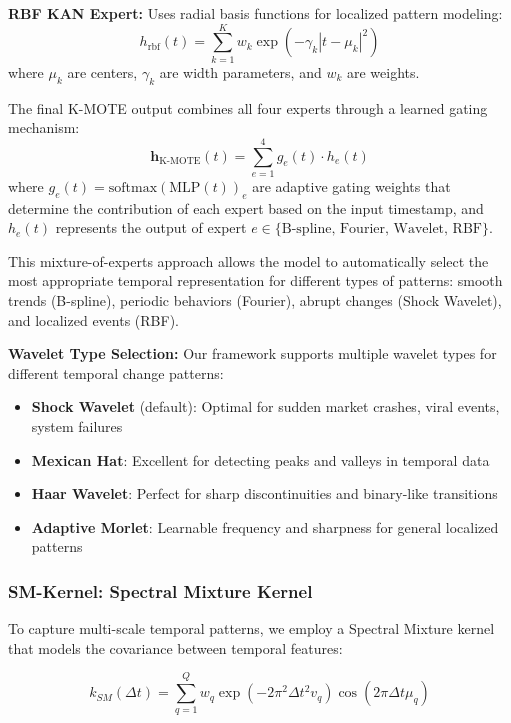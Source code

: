 \documentclass[conference]{IEEEtran}
\begin{document}
\textbf{RBF KAN Expert:} Uses radial basis functions for localized pattern modeling:
\begin{equation}
h_{\text{rbf}}(t) = \sum_{k=1}^{K} w_k \exp(-\gamma_k |t - \mu_k|^2)
\end{equation}
where $\mu_k$ are centers, $\gamma_k$ are width parameters, and $w_k$ are weights.

The final K-MOTE output combines all four experts through a learned gating mechanism:
\begin{equation}
\mathbf{h}_{\text{K-MOTE}}(t) = \sum_{e=1}^{4} g_e(t) \cdot h_e(t)
\end{equation}
where $g_e(t) = \text{softmax}(\text{MLP}(t))_e$ are adaptive gating weights that determine the contribution of each expert based on the input timestamp, and $h_e(t)$ represents the output of expert $e \in \{\text{B-spline, Fourier, Wavelet, RBF}\}$.

This mixture-of-experts approach allows the model to automatically select the most appropriate temporal representation for different types of patterns: smooth trends (B-spline), periodic behaviors (Fourier), abrupt changes (Shock Wavelet), and localized events (RBF).

\textbf{Wavelet Type Selection:} Our framework supports multiple wavelet types for different temporal change patterns:
\begin{itemize}
\item \textbf{Shock Wavelet} (default): Optimal for sudden market crashes, viral events, system failures
\item \textbf{Mexican Hat}: Excellent for detecting peaks and valleys in temporal data
\item \textbf{Haar Wavelet}: Perfect for sharp discontinuities and binary-like transitions
\item \textbf{Adaptive Morlet}: Learnable frequency and sharpness for general localized patterns
\end{itemize}

\subsubsection{SM-Kernel: Spectral Mixture Kernel}

To capture multi-scale temporal patterns, we employ a Spectral Mixture kernel that models the covariance between temporal features:

\begin{equation}
k_{SM}(\Delta t) = \sum_{q=1}^{Q} w_q \exp(-2\pi^2 \Delta t^2 v_q) \cos(2\pi \Delta t \mu_q)
\end{equation}
\end{document}
